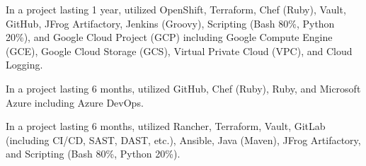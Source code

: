 \begin{cventries}
{\begin{cvitems}
        \item {In a project lasting 1 year, utilized OpenShift, Terraform, Chef (Ruby), Vault, GitHub, JFrog Artifactory, Jenkins (Groovy), Scripting (Bash 80\%, Python 20\%), and Google Cloud Project (GCP) including Google Compute Engine (GCE), Google Cloud Storage (GCS), Virtual Private Cloud (VPC), and Cloud Logging.}
        \item {In a project lasting 6 months, utilized GitHub, Chef (Ruby), Ruby, and Microsoft Azure including Azure DevOps.}
        \item {In a project lasting 6 months, utilized Rancher, Terraform, Vault, GitLab (including CI/CD, SAST, DAST, etc.), Ansible, Java (Maven), JFrog Artifactory, and Scripting (Bash 80\%, Python 20\%).}
      \end{cvitems}
    }


\end{cventries}
